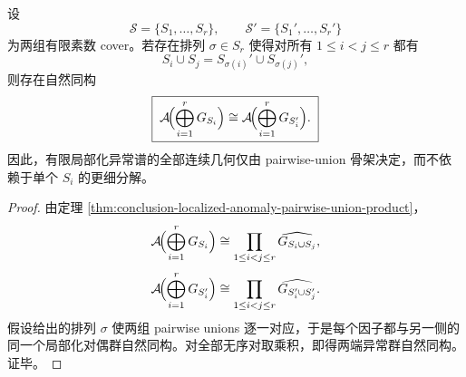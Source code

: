 \begin{theorem}\label{thm:conclusion-localized-anomaly-pairwise-skeleton-determines-spectrum}
设
\[
\mathcal S=\{S_1,\dots,S_r\},
\qquad
\mathcal S'=\{S_1',\dots,S_r'\}
\]
为两组有限素数 cover。若存在排列 \(\sigma\in S_r\) 使得对所有 \(1\le i<j\le r\) 都有
\[
S_i\cup S_j=S_{\sigma(i)}'\cup S_{\sigma(j)}',
\]
则存在自然同构
\[
\boxed{\;
\mathcal A\!\Bigl(\bigoplus_{i=1}^r G_{S_i}\Bigr)
\cong
\mathcal A\!\Bigl(\bigoplus_{i=1}^r G_{S_i'}\Bigr).\;}
\]
因此，有限局部化异常谱的全部连续几何仅由 pairwise-union 骨架决定，而不依赖于单个 \(S_i\) 的更细分解。
\end{theorem}
\begin{proof}
由定理 \ref{thm:conclusion-localized-anomaly-pairwise-union-product}，
\[
\mathcal A\!\Bigl(\bigoplus_{i=1}^r G_{S_i}\Bigr)
\cong
\prod_{1\le i<j\le r}\widehat{G_{S_i\cup S_j}},
\]
\[
\mathcal A\!\Bigl(\bigoplus_{i=1}^r G_{S_i'}\Bigr)
\cong
\prod_{1\le i<j\le r}\widehat{G_{S_i'\cup S_j'}}.
\]
假设给出的排列 \(\sigma\) 使两组 pairwise unions 逐一对应，于是每个因子都与另一侧的同一个局部化对偶群自然同构。对全部无序对取乘积，即得两端异常群自然同构。证毕。
\end{proof}
